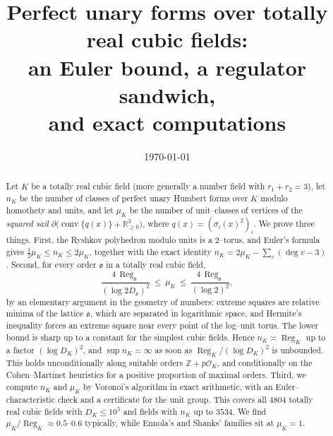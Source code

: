 \documentclass[11pt,reqno]{amsart}
\theoremstyle{plain}
\theoremstyle{definition}
\newcommand{\Z}{\mathbb{Z}}
\newcommand{\R}{\mathbb{R}}
\newcommand{\conv}{\operatorname{conv}}
\newcommand{\Reg}{\operatorname{Reg}}
\newcommand{\Ok}{\mathfrak{o}}
\newcommand{\bdy}{\partial}
\newcommand{\nK}{n_K}
\newcommand{\muK}{\mu_K}
\begin{document}
\title[Perfect unary forms over cubic fields]
{Perfect unary forms over totally real cubic fields:\\ an Euler bound, a regulator sandwich,\\ and exact computations}

\author{}
\date{\today}

\begin{abstract}
Let $K$ be a totally real cubic field (more generally a number field with $r_1+r_2=3$), let $\nK$ be the number
of classes of perfect unary Humbert forms over $K$ modulo homothety and units, and let $\muK$ be the number of
unit--classes of vertices of the \emph{squared sail} $\bdy\big(\conv\{q(x)\}+\R^3_{\ge0}\big)$, where
$q(x)=(\sigma_i(x)^2)_i$. We prove three things. First, the Ryshkov polyhedron modulo units is a $2$--torus,
and Euler's formula gives $\tfrac12\muK\le\nK\le2\muK$, together with the exact identity
$\nK=2\muK-\sum_v(\deg v-3)$. Second, for every order $\Ok$ in a totally real cubic field,
\[
\frac{4\,\Reg_\Ok}{(\log 2D_\Ok)^2}\ \le\ \muK\ \le\ \frac{4\,\Reg_\Ok}{(\log2)^2},
\]
by an elementary argument in the geometry of numbers: extreme squares are relative minima of the lattice
$\Ok$, which are separated in logarithmic space, and Hermite's inequality forces an extreme square near every
point of the log--unit torus. The lower bound is sharp up to a constant for the simplest cubic fields. Hence
$\nK\asymp\Reg_K$ up to a factor $(\log D_K)^2$, and $\sup\nK=\infty$ as soon as $\Reg_K/(\log D_K)^2$ is
unbounded. This holds unconditionally along suitable orders $\Z+p\mathcal O_K$, and conditionally on the
Cohen--Martinet heuristics for a positive proportion of maximal orders. Third, we compute $\nK$ and $\muK$ by
Voronoi's algorithm in exact arithmetic, with an Euler--characteristic check and a certificate for the unit
group. This covers all $4804$ totally real cubic fields with $D_K\le10^5$ and fields with $\nK$ up to $3534$.
We find $\muK/\Reg_K\approx0.5$--$0.6$ typically, while Ennola's and Shanks' families sit at $\muK=1$.


\end{abstract}
\end{document}
